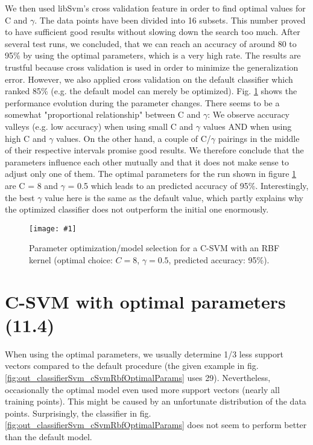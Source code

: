 \documentclass[a4paper,headings=small]{scrartcl}
\newcommand{\image}[3]{
	\begin{figure}[htbp]
		\centering
		\texttt{[image: \#1]}
		\caption{#3}
		\label{fig:#1}
	\end{figure}
}
\begin{document}
We then used libSvm's cross validation feature in order to find optimal values for C and $\gamma$. The data points have been divided into 16 subsets. This number proved to have sufficient good results without slowing down the search too much. After several test runs, we concluded, that we can reach an accuracy of around 80 to 95\% by using the optimal parameters, which is a very high rate. The results are trustful because cross validation is used in order to minimize the generalization error. However, we also applied cross validation on the default classifier which ranked 85\% (e.g. the default model can merely be optimized). Fig. \ref{fig:out_cSvmRbfParameterOptimization} shows the performance evolution during the parameter changes. There seems to be a somewhat "proportional relationship" between C and $\gamma$: We observe accuracy valleys (e.g. low accuracy) when using small C and $\gamma$ values AND when using high C and $\gamma$ values. On the other hand, a couple of C/$\gamma$ pairings in the middle of their respective intervals promise good results. We therefore conclude that the parameters influence each other mutually and that it does not make sense to adjust only one of them. The optimal parameters for the run shown in figure \ref{fig:out_cSvmRbfParameterOptimization} are C = 8 and $\gamma$ = 0.5 which leads to an predicted accuracy of 95\%. Interestingly, the best $\gamma$ value here is the same as the default value, which partly explains why the optimized classifier does not outperform the initial one enormously.

\image{out_cSvmRbfParameterOptimization}{0.9}%
	{Parameter optimization/model selection for a C-SVM with an RBF kernel (optimal choice: $C = 8$, $\gamma = 0.5$, predicted accuracy: 95\%).}


\section{C-SVM with optimal parameters (11.4)}

When using the optimal parameters, we usually determine 1/3 less support vectors compared to the default procedure (the given example in fig. \ref{fig:out_classifierSvm_cSvmRbfOptimalParams} uses 29). Nevertheless, occasionally the optimal model even used more support vectors (nearly all training points). This might be caused by an unfortunate distribution of the data points. Surprisingly, the classifier in fig. \ref{fig:out_classifierSvm_cSvmRbfOptimalParams} does not seem to perform better than the default model.
\end{document}
